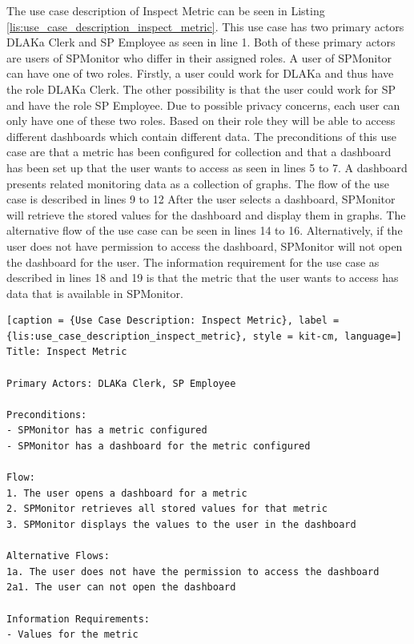 The use case description of Inspect Metric can be seen in Listing
\ref{lis:use_case_description_inspect_metric}. This use case has two primary
actors DLAKa Clerk and SP Employee as seen in line 1. Both of these primary actors are users of
SPMonitor who differ in their assigned roles. A user of SPMonitor can have one
of two roles. Firstly, a user could work for DLAKa and thus have the role DLAKa
Clerk. The other possibility is that the user could work for SP and have the
role SP Employee. Due to possible privacy concerns, each user can only have one
of these two roles. Based on their role they will be able to access different
dashboards which contain different data. The preconditions of this use case are
that a metric has been configured for collection and that a dashboard has been
set up that the user wants to access as seen in lines 5 to 7. A dashboard presents related monitoring
data as a collection of graphs. The flow of the use case is described in lines 9 to 12
After the user selects a dashboard, SPMonitor will retrieve the stored values for the dashboard and display them in graphs.
The alternative flow of the use case can be seen in lines 14 to 16.
Alternatively, if the user does not have permission to access the
dashboard, SPMonitor will not open the dashboard for the user.
The information requirement for the use case as described in lines 18 and 19 is that
the metric that the user wants to access has data that is available in SPMonitor.

\begin{lstlisting}[caption = {Use Case Description: Inspect Metric}, label = {lis:use_case_description_inspect_metric}, style = kit-cm, language=]
Title: Inspect Metric

Primary Actors: DLAKa Clerk, SP Employee

Preconditions:
- SPMonitor has a metric configured
- SPMonitor has a dashboard for the metric configured

Flow:
1. The user opens a dashboard for a metric
2. SPMonitor retrieves all stored values for that metric
3. SPMonitor displays the values to the user in the dashboard

Alternative Flows:
1a. The user does not have the permission to access the dashboard
2a1. The user can not open the dashboard

Information Requirements:
- Values for the metric
\end{lstlisting}

